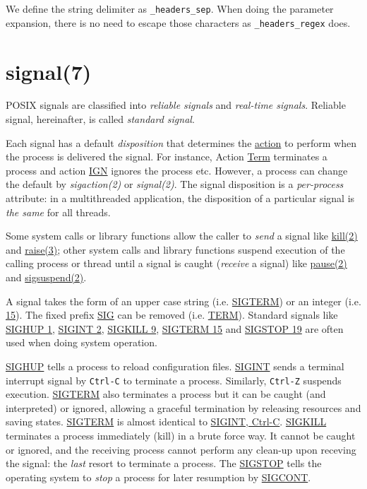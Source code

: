 We define the string delimiter as \lstinline|_headers_sep|. When
doing the parameter expansion, there is no need to escape those
characters as \lstinline|_headers_regex| does.

\section{signal(7)}
\label{sec:signal7}

POSIX signals are classified into \textit{reliable signals} and
\textit{real-time signals}. Reliable signal, hereinafter, is
called \textit{standard signal}.

Each signal has a default \textit{disposition} that determines the
\uline{action} to perform when the process is delivered the
signal. For instance, Action \uline{Term} terminates a process and
action \uline{IGN} ignores the process etc. However, a process can
change the default by \textit{sigaction(2)} or
\textit{signal(2)}. The signal disposition is a
\textit{per-process} attribute: in a multithreaded application,
the disposition of a particular signal is \textit{the same} for
all threads.

Some system calls or library functions allow the caller to
\textit{send} a signal like \uline{kill(2)} and \uline{raise(3)};
other system calls and library functions suspend execution of the
calling process or thread until a signal is caught
(\textit{receive} a signal) like \uline{pause(2)} and
\uline{sigsuspend(2)}.

A signal takes the form of an upper case string
(i.e. \uline{SIGTERM}) or an integer (i.e. \uline{15}). The fixed
prefix \uline{SIG} can be removed (i.e. \uline{TERM}). Standard
signals like \uline{SIGHUP 1}, \uline{SIGINT 2}, \uline{SIGKILL
  9}, \uline{SIGTERM 15} and \uline{SIGSTOP 19} are often used
when doing system operation.

\uline{SIGHUP} tells a process to reload configuration
files. \uline{SIGINT} sends a terminal interrupt signal by
\verb|Ctrl-C| to terminate a process. Similarly, \verb|Ctrl-Z|
suspends execution. \uline{SIGTERM} also terminates a process but
it can be caught (and interpreted) or ignored, allowing a graceful
termination by releasing resources and saving
states. \uline{SIGTERM} is almost identical to \uline{SIGINT,
  Ctrl-C}. \uline{SIGKILL} terminates a process immediately (kill)
in a brute force way. It cannot be caught or ignored, and the
receiving process cannot perform any clean-up upon receving the
signal: the \textit{last} resort to terminate a process. The
\uline{SIGSTOP} tells the operating system to \textit{stop} a
process for later resumption by \uline{SIGCONT}.

